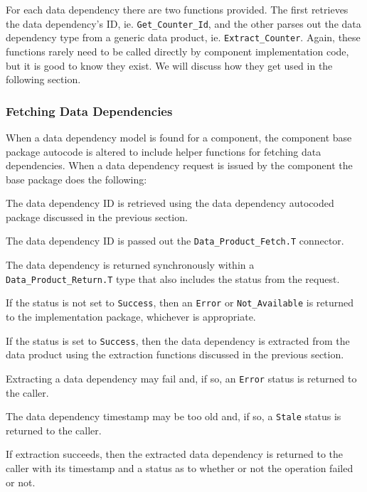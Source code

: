 For each data dependency there are two functions provided. The first retrieves the data dependency's ID, ie. \texttt{Get\_Counter\_Id}, and the other parses out the data dependency type from a generic data product, ie. \texttt{Extract\_Counter}. Again, these functions rarely need to be called directly by component implementation code, but it is good to know they exist. We will discuss how they get used in the following section.

\subsubsection{Fetching Data Dependencies}

When a data dependency model is found for a component, the component base package autocode is altered to include helper functions for fetching data dependencies. When a data dependency request is issued by the component the base package does the following:

\vspace{5mm} %
\begin{spacedenumerate}
  \item The data dependency ID is retrieved using the data dependency autocoded package discussed in the previous section.
  \item The data dependency ID is passed out the \texttt{Data\_Product\_Fetch.T} connector.
  \item The data dependency is returned synchronously within a \texttt{Data\_Product\_Return.T} type that also includes the status from the request.
  \item If the status is not set to \texttt{Success}, then an \texttt{Error} or \texttt{Not\_Available} is returned to the implementation package, whichever is appropriate.
  \item If the status is set to \texttt{Success}, then the data dependency is extracted from the data product using the extraction functions discussed in the previous section.
  \item Extracting a data dependency may fail and, if so, an \texttt{Error} status is returned to the caller.
  \item The data dependency timestamp may be too old and, if so, a \texttt{Stale} status is returned to the caller.
  \item If extraction succeeds, then the extracted data dependency is returned to the caller with its timestamp and a status as to whether or not the operation failed or not.
\end{spacedenumerate}
\vspace{5mm} %


